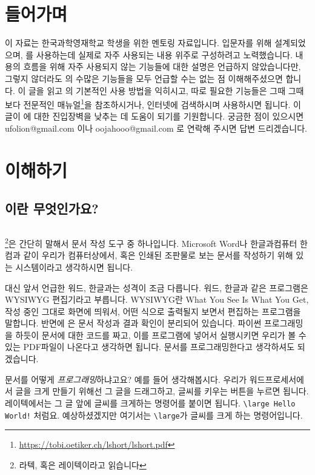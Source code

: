 
\section*{들어가며}
이 자료는 한국과학영재학교 학생을 위한 \lt 멘토링 자료입니다.
입문자를 위해 설계되었으며, \lt 를 사용하는데 실제로 자주 사용되는 내용 위주로 구성하려고 노력했습니다.
내용의 흐름을 위해 자주 사용되지 않는 기능들에 대한 설명은 언급하지 않았습니다만, 그렇지 않더라도 \lt 의 수많은 기능들을 모두 언급할 수는 없는 점 이해해주셨으면 합니다.
이 글을 읽고 \lt 의 기본적인 사용 방법을 익히시고, 따로 필요한 기능들은 그때 그때 보다 전문적인 매뉴얼\footnote{\url{https://tobi.oetiker.ch/lshort/lshort.pdf}}을 참조하시거나, 인터넷에 검색하시며 사용하시면 됩니다.
이 글이 \lt 에 대한 진입장벽을 낮추는 데 도움이 되기를 기원합니다.
궁금한 점이 있으시면 ufolion@gmail.com 이나 oojahooo@gmail.com 로 연락해 주시면 답변 드리겠습니다.
\section{\lt 이해하기}
\label{sec:1}

\subsection{\lt 이란 무엇인가요?}
\label{sec:1.1}
\subsection*{}
\lt \footnote{라텍, 혹은 레이텍이라고 읽습니다}은 간단히 말해서 문서 작성 도구 중 하나입니다.
Microsoft Word나 한글과컴퓨터 한컴과 같이 우리가 컴퓨터상에서, 혹은 인쇄된 조판물로 보는 문서를 작성하기 위해 있는 시스템이라고 생각하시면 됩니다.

대신 앞서 언급한 워드, 한글과는 성격이 조금 다릅니다.
워드, 한글과 같은 프로그램은 WYSIWYG 편집기라고 부릅니다.
WYSIWYG란 What You See Is What You Get, 작성 중인 그대로 화면에 띄워서, 어떤 식으로 출력될지 보면서 편집하는 프로그램을 말합니다.
반면에 \lt 은 문서 작성과 결과 확인이 분리되어 있습니다.
파이썬 프로그래밍을 하듯이 문서에 대한 코드를 짜고, 이를 \lt 프로그램에 넣어서 실행시키면 우리가 볼 수 있는 PDF파일이 나온다고 생각하면 됩니다.
문서를 프로그래밍한다고 생각하셔도 되겠습니다.

문서를 어떻게 \emph{프로그래밍}하냐고요?
예를 들어 생각해봅시다.
우리가 워드프로세서에서 글을 크게 만들기 위해선 그 글을 드래그하고, 글씨를 키우는 버튼을 누르면 됩니다.
레이텍에서는 그 글 앞에 글씨를 크게하는 명령어를 붙이면 됩니다. \verb|\large Hello World!| 처럼요.
예상하셨겠지만 여기서는 \verb|\large|가 글씨를 크게 하는 명령어입니다.

